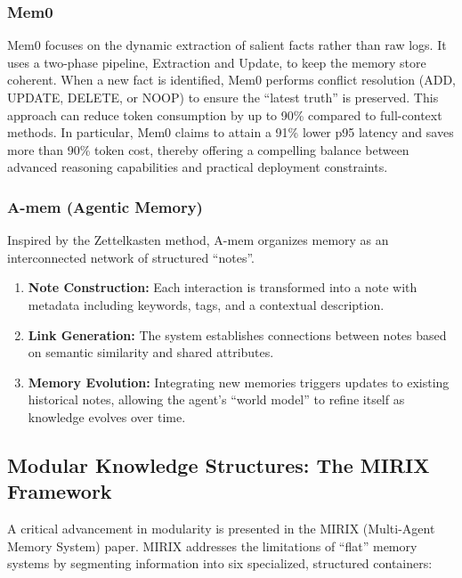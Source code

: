 ﻿\documentclass[12pt,a4paper]{article}
\begin{document}
\subsubsection{Mem0}

Mem0 \cite{chhikara2025mem0} focuses on the dynamic extraction of salient facts rather than raw logs. It uses a two-phase pipeline, Extraction and Update, to keep the memory store coherent. When a new fact is identified, Mem0 performs conflict resolution (ADD, UPDATE, DELETE, or NOOP) to ensure the ``latest truth'' is preserved. This approach can reduce token consumption by up to 90\% compared to full-context methods. In particular, Mem0 claims to attain a 91\% lower p95 latency and saves more than 90\% token cost, thereby offering a compelling balance between advanced reasoning capabilities and practical deployment constraints.

\subsubsection{A-mem (Agentic Memory)}

Inspired by the Zettelkasten method, A-mem \cite{xu2025amem} organizes memory as an interconnected network of structured ``notes''.

\begin{enumerate}
    \item \textbf{Note Construction:} Each interaction is transformed into a note with metadata including keywords, tags, and a contextual description.
    
    \item \textbf{Link Generation:} The system establishes connections between notes based on semantic similarity and shared attributes.
    
    \item \textbf{Memory Evolution:} Integrating new memories triggers updates to existing historical notes, allowing the agent's ``world model'' to refine itself as knowledge evolves over time.
\end{enumerate}

\subsection{Modular Knowledge Structures: The MIRIX Framework}

A critical advancement in modularity is presented in the MIRIX (Multi-Agent Memory System) \cite{wang2025mirix} paper. MIRIX addresses the limitations of ``flat'' memory systems by segmenting information into six specialized, structured containers:
\end{document}
